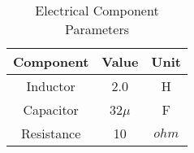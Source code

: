 \documentclass{article}
\begin{document}
\begin{table}[ht]
    \centering
    \begin{tabular}{|c|c|c|}
        \hline
        Component & Value & Unit \\
        \hline
        Inductor & 2.0 & H \\
        Capacitor & 32$\mu$ & F \\
        Resistance & 10 & $ohm$ \\
        \hline
    \end{tabular}
    \caption{Electrical Component Parameters}
    \label{tab:electrical_components}
\end{table}
\end{document}
